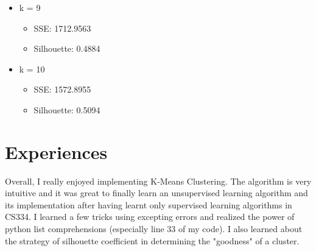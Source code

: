 \documentclass{article}
\begin{document}
\begin{itemize}
    \item{k = 9}
        \begin{itemize}
            \item SSE: 1712.9563
            \item Silhouette: 0.4884
        \end{itemize}
        
    \item{k = 10}
        \begin{itemize}
            \item SSE: 1572.8955
            \item Silhouette: 0.5094
        \end{itemize}
\end{itemize}

\section{Experiences}
Overall, I really enjoyed implementing K-Means Clustering. The algorithm is very intuitive and it was great to finally learn an unsupervised learning algorithm and its implementation after having learnt only supervised learning algorithms in CS334. I learned a few tricks using excepting errors and realized the power of python list comprehensions (especially line 33 of my code). I also learned about the strategy of silhouette coefficient in determining the "goodness" of a cluster.
\end{document}
